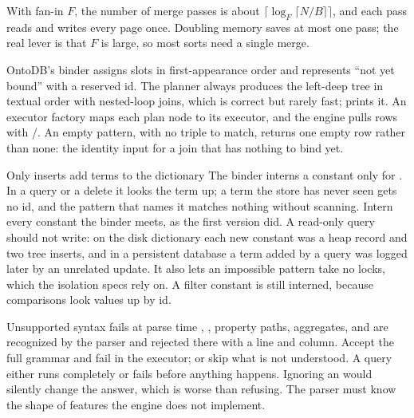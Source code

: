 With fan-in $F$, the number of merge passes is about
$\lceil \log_F \lceil N/B \rceil \rceil$, and each pass reads and writes every
page once. Doubling memory saves at most one pass; the real lever is that $F$
is large, so most sorts need a single merge.

\begin{ontodb}
OntoDB's binder assigns slots in first-appearance order and represents ``not yet
bound'' with a reserved id. The planner always produces the left-deep tree in
textual order with nested-loop joins, which is correct but rarely fast;
 prints it. An executor factory maps each plan node
to its executor, and the engine pulls rows with /.
An empty pattern, with no triple to match, returns one empty row rather than
none: the identity input for a join that has nothing to bind yet.
\end{ontodb}

\begin{decision}{Only inserts add terms to the dictionary}
 The binder interns a constant only for . In a
query or a delete it looks the term up; a term the store has never seen gets no
id, and the pattern that names it matches nothing without scanning.
 Intern every constant the binder meets, as the first
version did.
 A read-only query should not write: on the disk dictionary each new
constant was a heap record and two tree inserts, and in a persistent database
a term added by a query was logged later by an unrelated update. It also lets
an impossible pattern take no locks, which the isolation specs rely on.
 A filter constant is still interned, because comparisons look
values up by id.
\end{decision}

\begin{decision}{Unsupported syntax fails at parse time}
 , , property paths, aggregates, and
 are recognized by the parser and rejected there with
a line and column.
 Accept the full grammar and fail in the executor; or skip
what is not understood.
 A query either runs completely or fails before anything happens.
Ignoring an  would silently change the answer, which is worse
than refusing.
 The parser must know the shape of features the engine does not
implement.
\end{decision}

